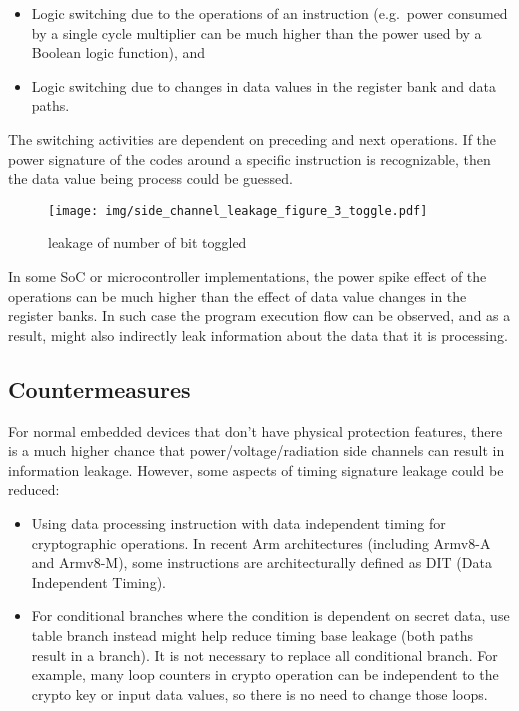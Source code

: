 \documentclass[
  a4paper,
]{report}
\providecommand{\tightlist}{%
  \setlength{\itemsep}{0pt}\setlength{\parskip}{0pt}}
\begin{document}
\begin{itemize}
\tightlist
\item
  Logic switching due to the operations of an instruction (e.g.~power
  consumed by a single cycle multiplier can be much higher than the
  power used by a Boolean logic function), and
\item
  Logic switching due to changes in data values in the register bank and
  data paths.
\end{itemize}

The switching activities are dependent on preceding and next operations.
If the power signature of the codes around a specific instruction is
recognizable, then the data value being process could be guessed.

\begin{figure}
\centering
\texttt{[image: img/side\_channel\_leakage\_figure\_3\_toggle.pdf]}
\caption{leakage of number of bit toggled}
\end{figure}

In some SoC or microcontroller implementations, the power spike effect
of the operations can be much higher than the effect of data value
changes in the register banks. In such case the program execution flow
can be observed, and as a result, might also indirectly leak information
about the data that it is processing.

\subsection{Countermeasures}\label{countermeasures}

For normal embedded devices that don't have physical protection
features, there is a much higher chance that power/voltage/radiation
side channels can result in information leakage. However, some aspects
of timing signature leakage could be reduced:

\begin{itemize}
\tightlist
\item
  Using data processing instruction with data independent timing for
  cryptographic operations. In recent Arm architectures (including
  Armv8-A and Armv8-M), some instructions are architecturally defined as
  DIT (Data Independent Timing).
\item
  For conditional branches where the condition is dependent on secret
  data, use table branch instead might help reduce timing base leakage
  (both paths result in a branch). It is not necessary to replace all
  conditional branch. For example, many loop counters in crypto
  operation can be independent to the crypto key or input data values,
  so there is no need to change those loops.
\end{itemize}
\end{document}

